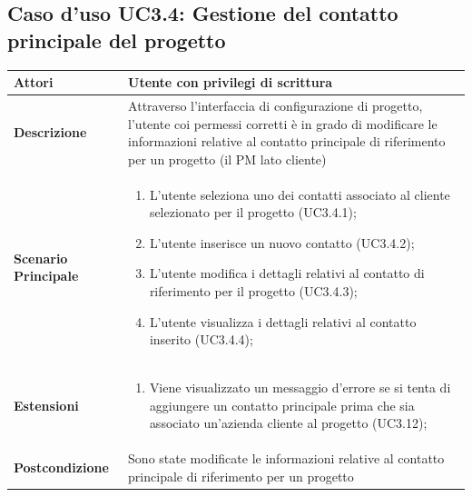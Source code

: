 \documentclass[12pt,a4paper,twoside,openright,english]{book}
\begin{document}
\begin{small}
	\subsection{Caso d'uso UC3.4: Gestione del contatto principale del progetto}
	\begin{longtable}{ | p{2.7cm} | p{12cm} |}
		\hline \textbf{Attori} & Utente con privilegi di scrittura\\ 
		\hline \textbf{Descrizione} & Attraverso l’interfaccia di configurazione di progetto, l’utente coi permessi corretti è in grado di modificare le informazioni relative al contatto principale di riferimento per un progetto (il PM lato cliente)\\ 
		\hline \textbf{Scenario Principale} & \begin{enumerate}
			\item L’utente seleziona uno dei contatti associato al cliente selezionato per il progetto  (UC3.4.1);
			\item L’utente inserisce un nuovo contatto  (UC3.4.2);
			\item L’utente modifica i dettagli relativi al contatto di riferimento per il progetto  (UC3.4.3);
			\item L’utente visualizza i dettagli relativi al contatto inserito  (UC3.4.4);
			
		\end{enumerate}
		\\ 
		\hline \textbf{Estensioni} & \begin{enumerate}
			\item Viene visualizzato un messaggio d'errore se si tenta di aggiungere un contatto principale prima che sia associato un'azienda cliente al progetto (UC3.12);
			
		\end{enumerate}
		\\ 
		\hline \textbf{Postcondizione} & Sono state modificate le informazioni relative al contatto principale di riferimento per un progetto \\ 
		\hline 
	\end{longtable}
	
	\hypertarget{UC3.5}{}

\end{small}
\end{document}
